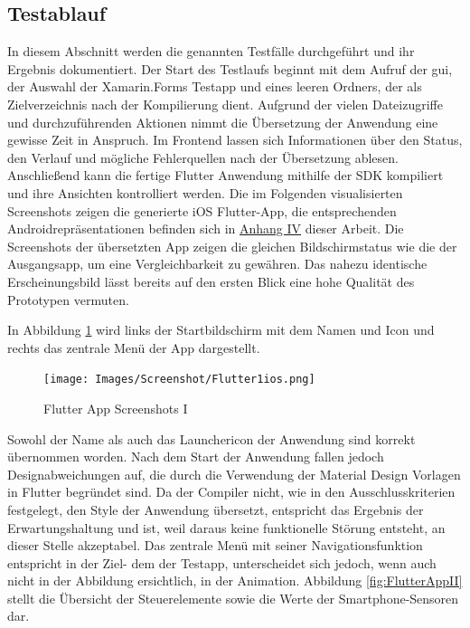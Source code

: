 \subsection{Testablauf}
In diesem Abschnitt werden die genannten Testfälle durchgeführt und ihr Ergebnis dokumentiert.
Der Start  des Testlaufs beginnt mit dem Aufruf der \ac{gui},  der Auswahl der Xamarin.Forms Testapp und eines leeren Ordners, der als Zielverzeichnis nach der Kompilierung dient. 
Aufgrund der vielen Dateizugriffe und durchzuführenden Aktionen nimmt die Übersetzung der Anwendung eine gewisse Zeit in Anspruch. Im Frontend lassen sich Informationen über den Status, den Verlauf und mögliche Fehlerquellen nach der Übersetzung ablesen.  Anschließend kann die fertige Flutter Anwendung mithilfe der SDK kompiliert und ihre Ansichten kontrolliert werden.  Die im Folgenden visualisierten Screenshots zeigen die generierte iOS Flutter-App,  die entsprechenden Androidrepräsentationen befinden sich in  \hyperref[chap:AnhangAndroidScreenshotsFlutter]{Anhang IV} dieser Arbeit.  Die Screenshots der übersetzten App zeigen die gleichen Bildschirmstatus wie die der Ausgangsapp, um eine Vergleichbarkeit zu gewähren.  Das nahezu identische Erscheinungsbild lässt bereits auf den ersten Blick eine hohe Qualität des Prototypen vermuten.  

In Abbildung \ref{fig:FlutterAppI} wird links der Startbildschirm mit dem Namen und Icon und rechts das zentrale Menü der App dargestellt. 

\begin{figure}[!ht]
 \texttt{[image: Images/Screenshot/Flutter1ios.png]}
 \caption{Flutter App Screenshots I}
 \label{fig:FlutterAppI}
\end{figure}
 Sowohl der Name als auch das Launchericon der Anwendung sind korrekt übernommen worden.  Nach dem Start der Anwendung fallen jedoch Designabweichungen auf, die durch die Verwendung der Material Design Vorlagen in Flutter begründet sind.  Da der Compiler nicht,  wie in den Ausschlusskriterien festgelegt, den Style der Anwendung übersetzt,  entspricht das Ergebnis der Erwartungshaltung und ist,  weil daraus keine funktionelle Störung
entsteht,  an dieser Stelle akzeptabel.  Das zentrale Menü mit seiner Navigationsfunktion entspricht in der Ziel- dem der Testapp,  
unterscheidet sich jedoch,  wenn auch nicht in der Abbildung ersichtlich,  in der Animation. 
\newpage
Abbildung \ref{fig:FlutterAppII} stellt die Übersicht der Steuerelemente sowie die Werte der Smartphone-Sensoren dar.

